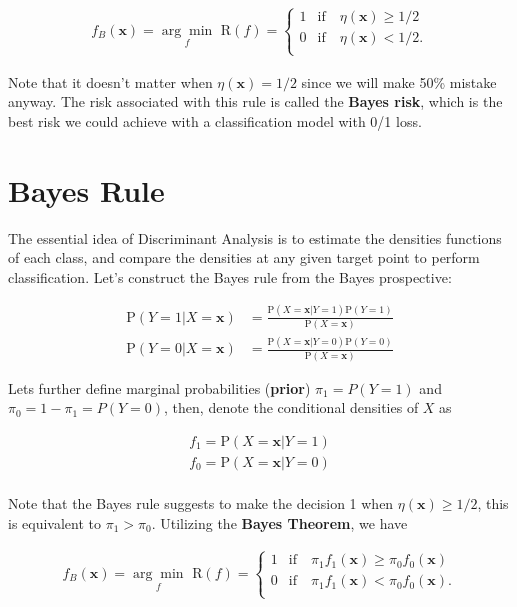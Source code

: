 \documentclass[
]{book}
\theoremstyle{definition}
\theoremstyle{definition}
\theoremstyle{definition}
\theoremstyle{definition}
\theoremstyle{remark}
\begin{document}
\begin{align}
f_B(\mathbf{x}) = \underset{f}{\arg\min} \,\, \text{R}(f) =
    \begin{cases}
    1 & \text{if} \quad \eta(\mathbf{x}) \geq 1/2 \\
    0 & \text{if} \quad \eta(\mathbf{x}) < 1/2. \\
    \end{cases}
\end{align}

Note that it doesn't matter when \(\eta(\mathbf{x}) = 1/2\) since we will make 50\% mistake anyway. The risk associated with this rule is called the \textbf{Bayes risk}, which is the best risk we could achieve with a classification model with 0/1 loss.

\hypertarget{bayes-rule}{%
\section{Bayes Rule}\label{bayes-rule}}

The essential idea of Discriminant Analysis is to estimate the densities functions of each class, and compare the densities at any given target point to perform classification. Let's construct the Bayes rule from the Bayes prospective:

\begin{align}
  \text{P}(Y = 1 | X = \mathbf{x}) &= \frac{\text{P}(X = \mathbf{x}| Y = 1)\text{P}(Y = 1)}{\text{P}(X = \mathbf{x})} \\
  \text{P}(Y = 0 | X = \mathbf{x}) &= \frac{\text{P}(X = \mathbf{x}| Y = 0)\text{P}(Y = 0)}{\text{P}(X = \mathbf{x})}
\end{align}

Lets further define marginal probabilities (\textbf{prior}) \(\pi_1 = P(Y = 1)\) and \(\pi_0 = 1 - \pi_1 = P(Y = 0)\), then, denote the conditional densities of \(X\) as

\begin{align}
  f_1 = \text{P}(X = \mathbf{x}| Y = 1)\\
  f_0 = \text{P}(X = \mathbf{x}| Y = 0)\\
\end{align}

Note that the Bayes rule suggests to make the decision 1 when \(\eta(\mathbf{x}) \geq 1/2\), this is equivalent to \(\pi_1 > \pi_0\). Utilizing the \textbf{Bayes Theorem}, we have

\begin{align}
f_B(\mathbf{x}) = \underset{f}{\arg\min} \,\, \text{R}(f) =
    \begin{cases}
    1 & \text{if} \quad \pi_1 f_1(\mathbf{x}) \geq \pi_0 f_0(\mathbf{x}) \\
    0 & \text{if} \quad \pi_1 f_1(\mathbf{x}) < \pi_0 f_0(\mathbf{x}). \\
    \end{cases}
\end{align}
\end{document}
